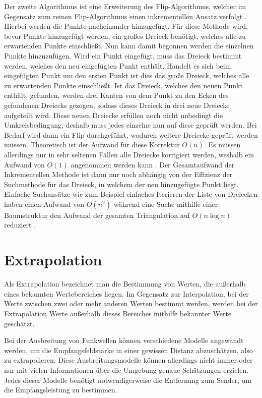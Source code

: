 \documentclass[10pt]{scrartcl}
\begin{document}
Der zweite Algorithmus ist eine Erweiterung des Flip-Algorithmus, welcher im Gegensatz zum reinen Flip-Algorithmus einen inkrementellen Ansatz verfolgt \cite[vgl.][S. 211ff]{computGeometry}. Hierbei werden die Punkte nacheinander hinzugefügt. Für diese Methode wird, bevor Punkte hinzugefügt werden, ein großes Dreieck benötigt, welches alle zu erwartenden Punkte einschließt. Nun kann damit begonnen werden die einzelnen Punkte hinzuzufügen. Wird ein Punkt eingefügt, muss das Dreieck bestimmt werden, welches den neu eingefügten Punkt enthält. Handelt es sich beim eingefügten Punkt um den ersten Punkt ist dies das große Dreieck, welches alle zu erwartenden Punkte einschließt. Ist das Dreieck, welches den neuen Punkt enthält, gefunden, werden drei Kanten von dem Punkt zu den Ecken des gefundenen Dreiecks gezogen, sodass dieses Dreieck in drei neue Dreiecke aufgeteilt wird. Diese neuen Dreiecke erfüllen noch nicht unbedingt die Umkreisbedingung, deshalb muss jedes einzelne nun auf diese geprüft werden. Bei Bedarf wird dann ein Flip durchgeführt, wodurch weitere Dreiecke geprüft werden müssen. Theoretisch ist der Aufwand für diese Korrektur $O(n)$. Es müssen allerdings nur in sehr seltenen Fällen alle Dreiecke korrigiert werden, weshalb ein Aufwand von $O(1)$ angenommen werden kann \cite[vgl.][S. 213]{computGeometry}. Der Gesamtaufwand der Inkrementellen Methode ist dann nur noch abhängig von der Effizienz der Suchmethode für das Dreieck, in welchem der neu hinzugefügte Punkt liegt. Einfache Suchansätze wie zum Beispiel einfaches Iterieren der Liste von Dreiecken haben einen Aufwand von $O(n^2)$ während eine Suche mithilfe einer Baumstruktur den Aufwand der gesamten Triangulation auf $O(n \log n)$ reduziert \cite[vgl.][S.213]{computGeometry}.

\section{Extrapolation}
Als Extrapolation bezeichnet man die Bestimmung von Werten, die außerhalb eines bekannten Wertebereiches liegen. Im Gegensatz zur Interpolation, bei der Werte zwischen zwei oder mehr anderen Werten bestimmt werden, werden bei der Extrapolation Werte außerhalb dieses Bereiches mithilfe bekannter Werte geschätzt.

Bei der Ausbreitung von Funkwellen können verschiedene Modelle angewandt werden, um die Empfangsfeldstärke in einer gewissen Distanz abzuschätzen, also zu extrapolieren. Diese Ausbreitungsmodelle können allerdings nicht immer oder nur mit vielen Informationen über die Umgebung genaue Schätzungen erzielen. Jedes dieser Modelle benötigt notwendigerweise die Entfernung zum Sender, um die Empfangsleistung zu bestimmen.
\end{document}
